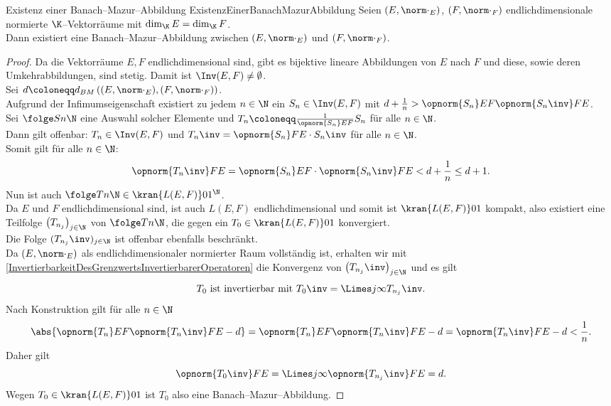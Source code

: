 \begin{satz}{Existenz einer Banach--Mazur--Abbildung}
            {ExistenzEinerBanachMazurAbbildung}
Seien $(E, \norm\cdot_E)$, $(F, \norm\cdot_F)$
endlichdimensionale normierte $\K$--Vektorräume mit $\dim_\K E = \dim_\K F$.\\
Dann existiert eine Banach--Mazur--Abbildung zwischen $(E, \norm\cdot_E)$ und
$(F, \norm\cdot_F)$.
\end{satz}
\begin{proof}
Da die Vektorräume $E, F$ endlichdimensional sind, gibt es bijektive lineare
Abbildungen von $E$ nach $F$ und diese, sowie deren Umkehrabbildungen, sind
stetig.
Damit ist $\Inv(E, F) \neq \emptyset$.\\
Sei $d\coloneqq d_{BM}\left( (E, \norm\cdot_E), (F, \norm\cdot_F) \right)$.\\
Aufgrund der Infimumseigenschaft  existiert zu jedem $n \in \N$ ein
$S_n \in \Inv(E, F)$ mit 
$d + \frac 1 n > \opnorm {S_n} E F \opnorm {S_n\inv}FE$.\\
Sei $\folge S n \N$ eine Auswahl solcher Elemente und
$T_n \coloneqq  \frac 1 {\opnorm {S_n} E F} S_n$ für alle $n \in \N$.\\
Dann gilt offenbar: 
$T_n \in \Inv(E, F)$ und $T_n\inv = \opnorm{S_n} F E \cdot S_n\inv$
für alle $n \in \N$.\\
Somit gilt für alle $n \in \N$:\[
\opnorm{T_n\inv}FE=\opnorm{S_n}EF\cdot\opnorm{S_n\inv}FE<d+\frac1n\le d+1
\text.\]
Nun ist auch $\folge T n \N \in \kran {L(E, F)} 0 1 ^\N$.\\
Da $E$ und $F$ endlichdimensional sind, ist auch $L(E, F)$ endlichdimensional
und somit ist $\kran{L(E,F)}01$ kompakt,
also existiert eine
Teilfolge $\left(T_{n_j}\right)_{j \in \N}$ von $\folge T n \N$, die gegen ein
$T_0 \in \kran{L(E, F)}01$ konvergiert.\\
Die Folge $(T_{n_j}\inv)_{j\in \N}$ ist offenbar ebenfalls
beschränkt.\\
Da $(E, \norm\cdot_E)$ als endlichdimensionaler normierter Raum vollständig
ist, erhalten wir mit
\ref{InvertierbarkeitDesGrenzwertsInvertierbarerOperatoren} die Konvergenz von
$\left(T_{n_j}\inv \right)_{j\in \N}$ und es gilt
\[T_0\text{ ist invertierbar mit }T_0\inv=\Limes j \infty T_{n_j}\inv\text. \]
Nach Konstruktion gilt für alle $n \in \N$\[ 
\abs{\opnorm {T_n} E F \opnorm{T_n\inv} F E - d} 
=\opnorm{T_n}EF\opnorm{T_n\inv}FE-d=\opnorm{T_n\inv}FE-d<\frac 1n\text.\]
Daher gilt\[
\opnorm {T_0\inv} F E = \Limes j \infty \opnorm {T_{n_j}\inv} F E = d\text.\]
Wegen $T_0 \in \kran{L(E, F)}01$ ist $T_0$ also eine Banach--Mazur--Abbildung.
\end{proof}